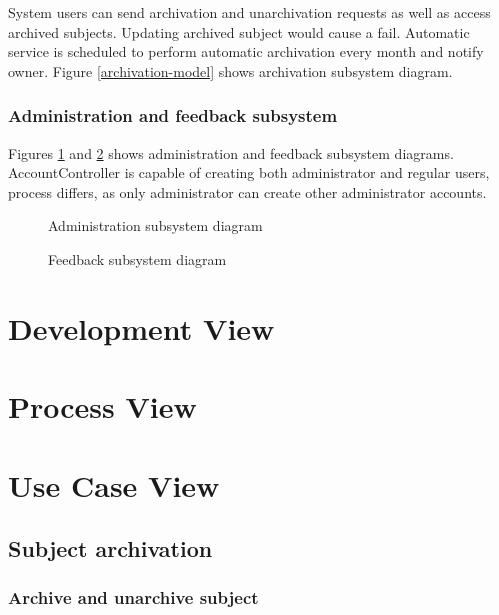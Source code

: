 \documentclass[
    english, %
]{VUMIFPSkursinis}
\begin{document}
System users can send archivation and unarchivation requests as well as access archived subjects. Updating archived subject would cause a fail. Automatic service is scheduled to perform automatic archivation every month and notify owner. Figure \ref{archivation-model} shows archivation subsystem diagram.

\subsubsection{Administration and feedback subsystem}

Figures \ref{administration-model} and \ref{feedback-model} shows administration and feedback subsystem diagrams. AccountController is capable of creating both administrator and regular users, process differs, as only administrator can create other administrator accounts.

\begin{figure}[ht]
    \centering
    
    \caption{Administration subsystem diagram}
    \label{administration-model}
\end{figure}

\begin{figure}[ht]
    \centering
    
    \caption{Feedback subsystem diagram}
    \label{feedback-model}
\end{figure}



\section{Development View}

\section{Process View}

\section{Use Case View}

\subsection{Subject archivation}

\subsubsection{Archive and unarchive subject}
\end{document}
